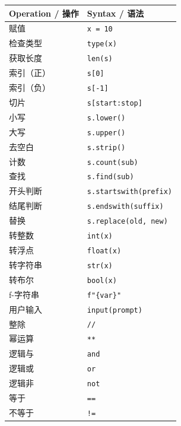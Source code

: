 \documentclass[11pt,a4paper]{article}
\begin{document}
\begin{table}[h]
\centering
\small
\renewcommand{\arraystretch}{1.3}
\begin{tabular}{@{}ll@{}}
\toprule
\textbf{Operation / 操作} & \textbf{Syntax / 语法} \\ \midrule
赋值 & \texttt{x = 10} \\
检查类型 & \texttt{type(x)} \\
获取长度 & \texttt{len(s)} \\
索引（正） & \texttt{s[0]} \\
索引（负） & \texttt{s[-1]} \\
切片 & \texttt{s[start:stop]} \\
小写 & \texttt{s.lower()} \\
大写 & \texttt{s.upper()} \\
去空白 & \texttt{s.strip()} \\
计数 & \texttt{s.count(sub)} \\
查找 & \texttt{s.find(sub)} \\
开头判断 & \texttt{s.startswith(prefix)} \\
结尾判断 & \texttt{s.endswith(suffix)} \\
替换 & \texttt{s.replace(old, new)} \\
转整数 & \texttt{int(x)} \\
转浮点 & \texttt{float(x)} \\
转字符串 & \texttt{str(x)} \\
转布尔 & \texttt{bool(x)} \\
f-字符串 & \texttt{f"\{var\}"} \\
用户输入 & \texttt{input(prompt)} \\
整除 & \texttt{//} \\
幂运算 & \texttt{**} \\
逻辑与 & \texttt{and} \\
逻辑或 & \texttt{or} \\
逻辑非 & \texttt{not} \\
等于 & \texttt{==} \\
不等于 & \texttt{!=} \\ \bottomrule
\end{tabular}
\end{table}
\end{document}
